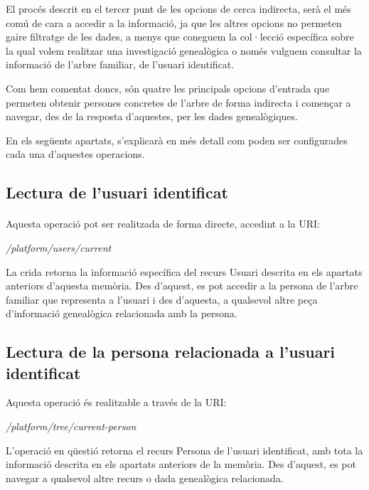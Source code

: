         El procés descrit en el tercer punt de les opcions de cerca indirecta, serà el més comú de cara a accedir a la informació, ja que les altres opcions no permeten gaire filtratge de les dades, a menys que coneguem la col·lecció específica sobre la qual volem realitzar una investigació genealògica o només vulguem consultar la informació de l'arbre familiar, de l'usuari identificat.

        Com hem comentat doncs, són quatre les principals opcions d'entrada que permeten obtenir persones concretes de l'arbre de forma indirecta i començar a navegar, des de la resposta d'aquestes, per les dades genealògiques.

        En els següents apartats,  s'explicarà en més detall com poden ser configurades cada una d'aquestes operacions.


    \subsection{Lectura de l'usuari identificat}

        \paragraph{}
        Aquesta operació pot ser realitzada de forma directe, accedint a la URI:

        \begin{displayquote}
            \emph{/platform/users/current}
        \end{displayquote}

        La crida retorna la informació específica del recurs Usuari descrita en els apartats anteriors d'aquesta memòria. Des d'aquest, es pot accedir a la persona de l'arbre familiar que representa a l'usuari i des d’aquesta, a qualsevol altre peça d'informació genealògica relacionada amb la persona.


    \subsection{Lectura de la persona relacionada a l'usuari identificat}

        Aquesta operació és realitzable a través de la URI:

        \begin{displayquote}
            \emph{/platform/tree/current-person}
        \end{displayquote}

        L'operació en qüestió retorna el recurs Persona de l'usuari identificat, amb tota la informació descrita en els apartats anteriors de la memòria. Des d'aquest, es pot navegar a qualsevol altre recurs o dada genealògica relacionada.

